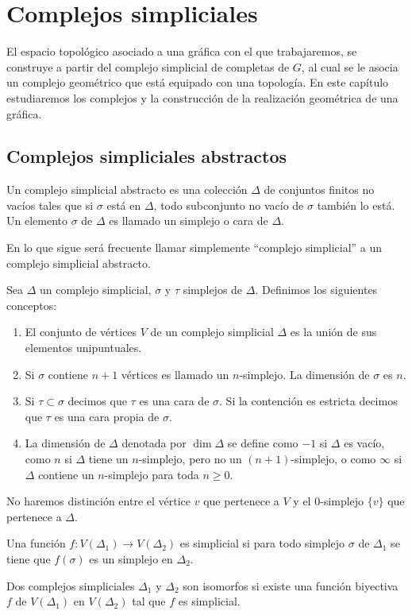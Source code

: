 \chapter{Complejos simpliciales}
El espacio topológico asociado a una gráfica con el que trabajaremos, se construye a partir del complejo simplicial de completas de $G$, al cual se le asocia un complejo geométrico que está equipado con una topología. En este capítulo estudiaremos los complejos y la construcción de la realización geométrica de una gráfica.

\section{Complejos simpliciales abstractos}
\label{sec:compl-simpl-abstr}


\begin{Defi}
Un complejo simplicial abstracto es una colección $\Delta$ de conjuntos finitos no vacíos tales que si $\sigma$ está en $\Delta$, todo subconjunto no vacío de $\sigma$ también lo está. Un elemento $\sigma$ de $\Delta$ es llamado un simplejo o cara de $\Delta$. 
\end{Defi}

En lo que sigue será frecuente llamar simplemente ``complejo
simplicial'' a un complejo simplicial abstracto.

\begin{Defi}
Sea $\Delta$ un complejo simplicial, $\sigma$ y $\tau$ simplejos de $\Delta$. Definimos los siguientes conceptos:
\begin{enumerate}
\item El conjunto de vértices $V$ de un complejo simplicial $\Delta$ es la unión de sus elementos unipuntuales.
\item Si $\sigma$ contiene $n + 1$ vértices es llamado un $n$-simplejo. La dimensión de $\sigma$ es $n$.
\item Si $\tau\subset\sigma$ decimos que $\tau$ es una cara de $\sigma$. Si la contención es estricta decimos que $\tau$ es una cara propia de $\sigma$.
\item La dimensión de $\Delta$ denotada por $\dim\Delta$ se define
  como $-1$ si $\Delta$ es vacío, como $n$ si $\Delta$ tiene un
  $n$-simplejo, pero no un $(n+1)$-simplejo, o como $\infty$ si $\Delta$ contiene un $n$-simplejo para toda $n\geq 0$.
\end{enumerate}
\end{Defi}
No haremos distinción entre el vértice $v$ que pertenece a $V$ y el 0-simplejo $\{v\}$ que pertenece a $\Delta$.
\begin{Defi}
Una función $f\colon V(\Delta_1)\rightarrow V(\Delta_2)$ es simplicial si para todo simplejo $\sigma$ de $\Delta_1$ se tiene que $f(\sigma)$ es un simplejo en $\Delta_2$.
\end{Defi}
\begin{Defi}
Dos complejos simpliciales $\Delta_1$ y $\Delta_2$ son isomorfos si existe una función biyectiva $f$ de $V(\Delta_1)$ en $V(\Delta_2)$ tal que $f$ es simplicial.
\end{Defi}

